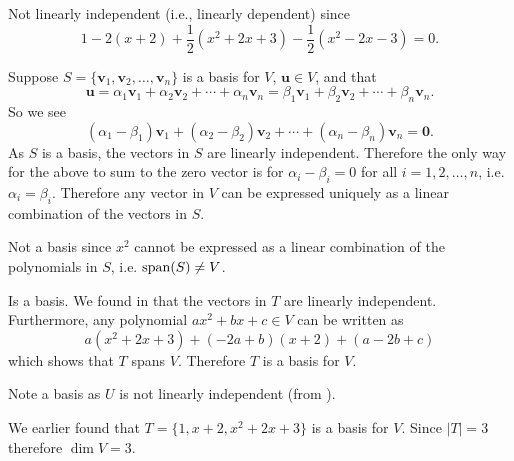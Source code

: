 \begin{questions}
\begin{partquestions}{\alph*}
        \item Not linearly independent (i.e., linearly dependent) since
        \[
            1 - 2(x+2) + \frac12(x^2 + 2x + 3) - \frac12(x^2 - 2x - 3) = 0.
        \]
    \end{partquestions}

    \item Suppose $S = \{\textbf{v}_1, \textbf{v}_2, \dots, \textbf{v}_n\}$ is a basis for $V$, $\textbf{u} \in V$, and that
    \[
        \textbf{u} = \alpha_1\textbf{v}_1 + \alpha_2\textbf{v}_2 + \cdots + \alpha_n\textbf{v}_n = \beta_1\textbf{v}_1 + \beta_2\textbf{v}_2 + \cdots + \beta_n\textbf{v}_n.
    \]
    So we see
    \[
        (\alpha_1 - \beta_1)\textbf{v}_1 + (\alpha_2 - \beta_2)\textbf{v}_2 + \cdots + (\alpha_n - \beta_n)\textbf{v}_n = \textbf{0}.
    \]
    As $S$ is a basis, the vectors in $S$ are linearly independent. Therefore the only way for the above to sum to the zero vector is for $\alpha_i - \beta_i = 0$ for all $i = 1, 2, \dots, n$, i.e. $\alpha_i = \beta_i$. Therefore any vector in $V$ can be expressed uniquely as a linear combination of the vectors in $S$.

    \item \begin{partquestions}{\alph*}
        \item Not a basis since $x^2$ cannot be expressed as a linear combination of the polynomials in $S$, i.e. $\mathrm{span}(S) \neq V$.

        \item Is a basis. We found in  that the vectors in $T$ are linearly independent. Furthermore, any polynomial $ax^2 + bx + c \in V$ can be written as
        \[
            a(x^2+2x+3) + (-2a+b)(x+2) + (a-2b+c)
        \]
        which shows that $T$ spans $V$. Therefore $T$ is a basis for $V$.

        \item Note a basis as $U$ is not linearly independent (from ).
    \end{partquestions}

    \item We earlier found that $T = \{1, x + 2, x^2 + 2x + 3\}$ is a basis for $V$. Since $|T| = 3$ therefore $\dim{V} = 3$.
\end{questions}

